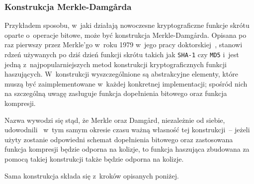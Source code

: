 \subsubsection{Konstrukcja Merkle-Damg\r{a}rda}
Przykładem sposobu, w~jaki działają nowoczesne kryptograficzne funkcje skrótu
oparte o~operacje bitowe, może być konstrukcja Merkle-Damg\r{a}rda. Opisana po
raz pierwszy przez Merkle'go w~roku 1979 w~jego pracy
doktorskiej~\cite{merkle_damgard_construction}, stanowi rdzeń używanych po dziś
dzień funkcji skrótu takich jak \texttt{SHA-1} czy \texttt{MD5} i~jest jedną
z~najpopularniejszych metod konstrukcji kryptograficznych funkcji haszujących.
W~konstrukcji wyszczególnione są abstrakcyjne elementy, które muszą być
zaimplementowane w~każdej konkretnej implementacji; spośród nich na szczególną
uwagę zasługuje funkcja dopełnienia bitowego oraz funkcja kompresji.

Nazwa wywodzi się stąd, że Merkle oraz Damg\r{a}rd, niezależnie od siebie,
udowodnili~\cite{merkle_damgard_security1,merkle_damgard_security2} w~tym samym
okresie czasu ważną własność tej konstrukcji~-- jeżeli użyty zostanie
odpowiedni schemat dopełnienia bitowego oraz zastosowana funkcja kompresji
będzie odporna na kolizje, to funkcja haszująca zbudowana za pomocą takiej
konstrukcji także będzie odporna na kolizje.

Sama konstrukcja składa się z~kroków opisanych poniżej.

